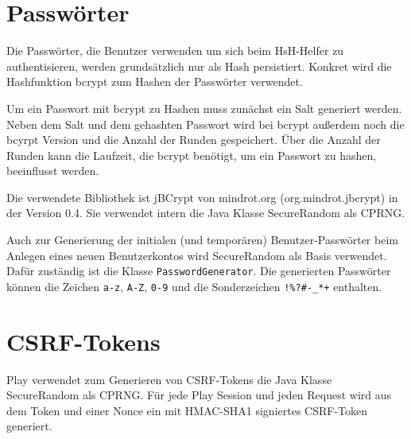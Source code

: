 \documentclass[12pt,DIV14,BCOR10mm,a4paper,parskip=half-,headsepline,headinclude,english,ngerman,bibliography=totocnumbered]{scrreprt}
\begin{document}
\section{Passwörter}
Die Passwörter, die Benutzer verwenden um sich beim HsH-Helfer zu authentisieren, werden grundsätzlich nur als Hash persistiert. Konkret wird die Hashfunktion bcrypt zum Hashen der Passwörter verwendet.

Um ein Passwort mit bcrypt zu Hashen muss zunächst ein Salt generiert werden. Neben dem Salt und dem gehashten Passwort wird bei bcrypt außerdem noch die bcyrpt Version und die Anzahl der Runden gespeichert. Über die Anzahl der Runden kann die Laufzeit, die bcrypt benötigt, um ein Passwort zu hashen, beeinflusst werden.

Die verwendete Bibliothek ist jBCrypt von mindrot.org (org.mindrot.jbcrypt) in der Version 0.4. Sie verwendet intern die Java Klasse SecureRandom als CPRNG.

Auch zur Generierung der initialen (und temporären) Benutzer-Passwörter beim Anlegen eines neuen Benutzerkontos wird SecureRandom als Basis verwendet. Dafür zuständig ist die Klasse \texttt{PasswordGenerator}. Die generierten Passwörter können die Zeichen \texttt{a-z}, \texttt{A-Z}, \texttt{0-9} und die Sonderzeichen \texttt{!\%?\#-\_*+} enthalten.

\section{CSRF-Tokens}
Play verwendet zum Generieren von CSRF-Tokens die Java Klasse SecureRandom als CPRNG. Für jede Play Session und jeden Request wird aus dem Token und einer Nonce ein mit HMAC-SHA1 signiertes CSRF-Token generiert.
\end{document}
